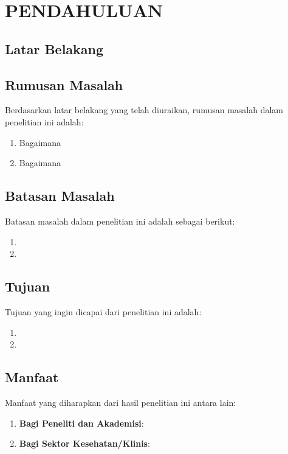 \chapter{PENDAHULUAN}
\label{chap:pendahuluan}

\section{Latar Belakang}
\label{sec:latarbelakang}

\lipsum[1-2]

\section{Rumusan Masalah}
\label{sec:rumusanmasalah}

Berdasarkan latar belakang yang telah diuraikan, rumusan masalah dalam penelitian ini adalah:
\begin{enumerate}
  \item Bagaimana \lipsum[1][1-2]
  \item Bagaimana \lipsum[2][1-2]
\end{enumerate}

\section{Batasan Masalah}
\label{sec:batasanmasalah}

Batasan masalah dalam penelitian ini adalah sebagai berikut:
\begin{enumerate}
  \item \lipsum[3][1-2]
  \item \lipsum[4][1-2]
\end{enumerate}

\section{Tujuan}
\label{sec:tujuan}

Tujuan yang ingin dicapai dari penelitian ini adalah:
\begin{enumerate}
  \item \lipsum[1][1-2]
  \item \lipsum[2][1-2]
\end{enumerate}

\section{Manfaat}
\label{sec:manfaat}

Manfaat yang diharapkan dari hasil penelitian ini antara lain:
\begin{enumerate}
  \item \textbf{Bagi Peneliti dan Akademisi}: \lipsum[1][1-3]
  \item \textbf{Bagi Sektor Kesehatan/Klinis}: \lipsum[2][1-3]
\end{enumerate}


